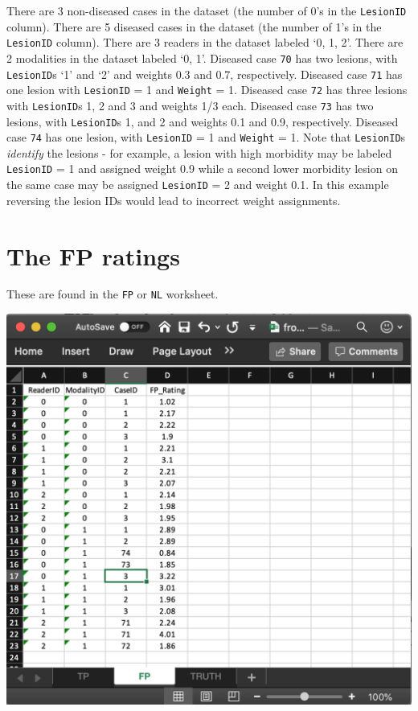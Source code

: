 \documentclass[
]{book}
\begin{document}
There are 3 non-diseased cases in the dataset (the number of 0's in the \texttt{LesionID} column). There are 5 diseased cases in the dataset (the number of 1's in the \texttt{LesionID} column). There are 3 readers in the dataset labeled `0, 1, 2'. There are 2 modalities in the dataset labeled `0, 1'. Diseased case \texttt{70} has two lesions, with \texttt{LesionID}s `1' and `2' and weights 0.3 and 0.7, respectively. Diseased case \texttt{71} has one lesion with \texttt{LesionID} = 1 and \texttt{Weight} = 1. Diseased case \texttt{72} has three lesions with \texttt{LesionID}s 1, 2 and 3 and weights 1/3 each. Diseased case \texttt{73} has two lesions, with \texttt{LesionID}s 1, and 2 and weights 0.1 and 0.9, respectively. Diseased case \texttt{74} has one lesion, with \texttt{LesionID} = 1 and \texttt{Weight} = 1. Note that \texttt{LesionID}s \emph{identify} the lesions - for example, a lesion with high morbidity may be labeled \texttt{LesionID} = 1 and assigned weight 0.9 while a second lower morbidity lesion on the same case may be assigned \texttt{LesionID} = 2 and weight 0.1. In this example reversing the lesion IDs would lead to incorrect weight assignments.

\hypertarget{quick-start-froc-data-fp}{%
\section{The FP ratings}\label{quick-start-froc-data-fp}}

These are found in the \texttt{FP} or \texttt{NL} worksheet.

\includegraphics[width=1\textwidth,height=\textheight]{images/quick-start/frocCrNL.png}
\end{document}
